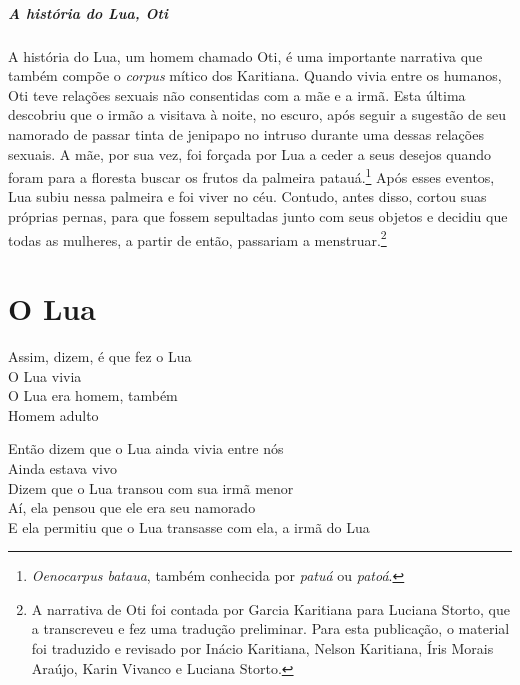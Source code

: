 \vspace*{\fill}
\paragraph{A história do Lua, Oti} A história do Lua, um homem chamado Oti, é uma importante narrativa que também compõe o \textit{corpus} mítico dos Karitiana. Quando vivia entre
os humanos, Oti teve relações sexuais não consentidas com a mãe e a
irmã. Esta última descobriu que o irmão a visitava à noite, no escuro,
após seguir a sugestão de seu namorado de passar tinta de jenipapo no
intruso durante uma dessas relações sexuais. A mãe, por sua vez, foi
forçada por Lua a ceder a seus desejos quando foram para a floresta
buscar os frutos da palmeira patauá.\footnote{\textit{Oenocarpus bataua}, também 
conhecida por \textit{patuá} ou \textit{patoá}.} Após esses eventos, Lua subiu
nessa palmeira e foi viver no céu. Contudo, antes disso, cortou suas
próprias pernas, para que fossem sepultadas junto com seus objetos e
decidiu que todas as mulheres, a partir de então, passariam a menstruar.\footnote{A narrativa de Oti foi contada por Garcia Karitiana para Luciana Storto,
que a transcreveu e fez uma tradução preliminar. Para esta publicação, o
material foi traduzido e revisado por Inácio Karitiana, Nelson
Karitiana, Íris Morais Araújo, Karin Vivanco e Luciana Storto.}
\vspace*{\fill}


\chapter{O Lua}

\begin{linenumbers}
\noindent Assim, dizem, é que fez o Lua\\
O Lua vivia\\
O Lua era homem, também\\
Homem adulto
\end{linenumbers}

\bigskip

\begin{linenumbers}
\noindent Então dizem que o Lua ainda vivia entre nós\\
Ainda estava vivo\\
Dizem que o Lua transou com sua irmã menor\\
Aí, ela pensou que ele era seu namorado\\
E ela permitiu que o Lua transasse com ela, a irmã do Lua
\end{linenumbers}

